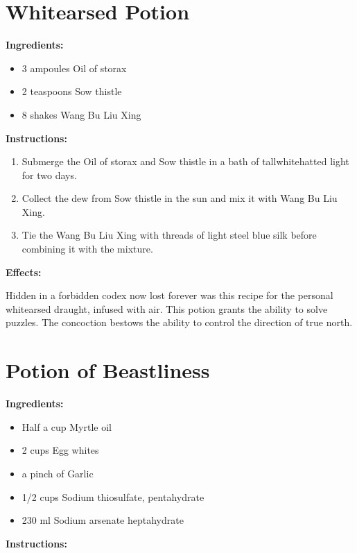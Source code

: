 \documentclass{article}
\begin{document}
\newpage
\section*{Whitearsed Potion}

\textbf{Ingredients:}

\begin{itemize}
  \item 3 ampoules Oil of  storax
  \item 2 teaspoons Sow thistle
  \item 8 shakes Wang Bu Liu Xing
\end{itemize}

\textbf{Instructions:}

\begin{enumerate}
  \item Submerge the Oil of  storax and Sow thistle in a bath of tallwhitehatted light for two days.
  \item Collect the dew from Sow thistle in the sun and mix it with Wang Bu Liu Xing.
  \item Tie the Wang Bu Liu Xing with threads of light steel blue silk before combining it with the mixture.
\end{enumerate}

\textbf{Effects:}

Hidden in a forbidden codex now lost forever was this recipe for the personal whitearsed draught, infused with air. This potion grants the ability to solve puzzles. The concoction bestows the ability to control the direction of true north.

\newpage
\section*{Potion of Beastliness}

\textbf{Ingredients:}

\begin{itemize}
  \item Half a cup Myrtle oil
  \item 2 cups Egg whites
  \item a pinch of Garlic
  \item 1/2 cups Sodium thiosulfate, pentahydrate
  \item 230 ml Sodium arsenate heptahydrate
\end{itemize}

\textbf{Instructions:}
\end{document}
